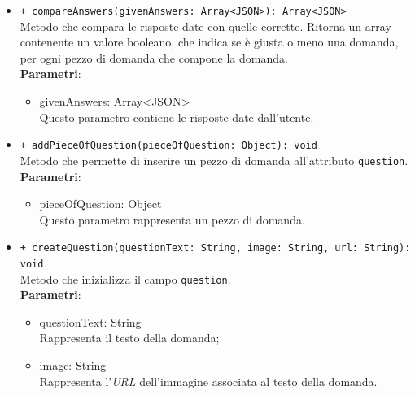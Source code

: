 \begin{itemize}
\begin{itemize}
				\item \texttt{+ compareAnswers(givenAnswers: Array<JSON>): Array<JSON>} \\
				Metodo che compara le risposte date con quelle corrette. Ritorna un array contenente un valore booleano, che indica se è giusta o meno una domanda, per ogni pezzo di domanda che compone la domanda. \\
				\textbf{Parametri}:
				\begin{itemize}
					\item {givenAnswers: Array<JSON>}\\
					Questo parametro contiene le risposte date dall'utente. 
				\end{itemize}
				
				\item \texttt{+ addPieceOfQuestion(pieceOfQuestion: Object): void} \\
				Metodo che permette di inserire un pezzo di domanda all'attributo \texttt{question}.\\
				\textbf{Parametri}:
				\begin{itemize}
					\item {pieceOfQuestion: Object}\\
					Questo parametro rappresenta un pezzo di domanda.
				\end{itemize}
				
				\item \texttt{+ createQuestion(questionText: String, image: String, url: String):\\ void} \\
				Metodo che inizializza il campo \texttt{question}.\\
				\textbf{Parametri}:
				\begin{itemize}
					\item {questionText: String}\\
					Rappresenta il testo della domanda;
					\item {image: String}\\
					Rappresenta l'\textit{URL} dell'immagine associata al testo della domanda. 
				\end{itemize}	
			\end{itemize}
		\end{itemize}
		
		